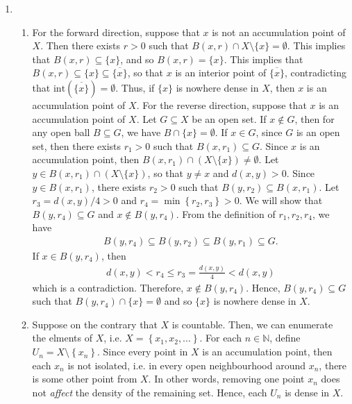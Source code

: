 \documentclass[11pt]{amsart}
\theoremstyle{plain}
\numberwithin{equation}{section}
\begin{document}
\begin{enumerate}[label=\textbf{(\alph*)}]
\item\begin{enumerate}[label=\textbf{(\roman*)}]
    \itemsep 0em
    \item For the forward direction, suppose that $x$ is not an accumulation point of $X$. Then there exists $r>0$ such that $B(x,r)\cap X\setminus\{x\}=\emptyset$. This implies that $B(x,r)\subseteq\{x\}$, and so $B(x,r)=\{x\}$. This implies that $B(x,r)\subseteq\{x\}\subseteq\overline{\{x\}}$, so that $x$ is an interior point of $\overline{\{x\}}$, contradicting that $\mathrm{int}\left(\overline{\{x\}}\right)=\emptyset$. Thus, if $\{x\}$ is nowhere dense in $X$, then $x$ is an accumulation point of $X$.
    \newline
    \newline For the reverse direction, suppose that $x$ is an accumulation point of $X$. Let $G\subseteq X$ be an open set. If $x\not\in G$, then for any open ball $B\subseteq G$, we have $B\cap\{x\}=\emptyset$. If $x\in G$, since $G$ is an open set, then there exists $r_{1}>0$ such that $B\left(x,r_{1}\right)\subseteq G$. Since $x$ is an accumulation point, then $B\left(x,r_{1}\right)\cap\left(X\setminus\{x\}\right)\neq\emptyset$. Let $y\in B\left(x,r_{1}\right)\cap\left(X\setminus\{x\}\right)$, so that $y\neq x$ and $d(x,y)>0$. Since $y\in B\left(x,r_{1}\right)$, there exists $r_{2}>0$ such that $B\left(y,r_{2}\right)\subseteq B\left(x,r_{1}\right)$. Let $r_{3}=d(x,y)/4>0$ and $r_{4}=\min\left\{r_{2},r_{3}\right\}>0$. We will show that $B\left(y,r_{4}\right)\subseteq G$ and $x\not\in B\left(y,r_{4}\right)$. From the definition of $r_{1},r_{2},r_{4}$, we have
\begin{align*}
    B\left(y,r_{4}\right)\subseteq B\left(y,r_{2}\right)\subseteq B\left(y,r_{1}\right)\subseteq G.
\end{align*}
If $x\in B\left(y,r_{4}\right)$, then
\begin{align*}
    d(x,y)<r_{4}\leq r_{3}=\frac{d(x,y)}{4}<d(x,y)
\end{align*}
which is a contradiction. Therefore, $x\not\in B\left(y,r_{4}\right)$. Hence, $B\left(y,r_{4}\right)\subseteq G$ such that $B\left(y,r_{4}\right)\cap\{x\}=\emptyset$ and so $\{x\}$ is nowhere dense in $X$.
\item Suppose on the contrary that $X$ is countable. Then, we can enumerate the elments of $X$, i.e. $X=\left\{x_{1},x_{2},\dots\right\}$. For each $n\in\mathbb{N}$, define $U_{n}=X\setminus\left\{x_{n}\right\}$. Since every point in $X$ is an accumulation point, then each $x_n$ is not isolated, i.e. in every open neighbourhood around $x_n$, there is some other point from $X$. In other words, removing one point $x_n$ does not \emph{affect} the density of the remaining set. Hence, each $U_n$ is dense in $X$. 

\end{enumerate}
\end{enumerate}
\end{document}
